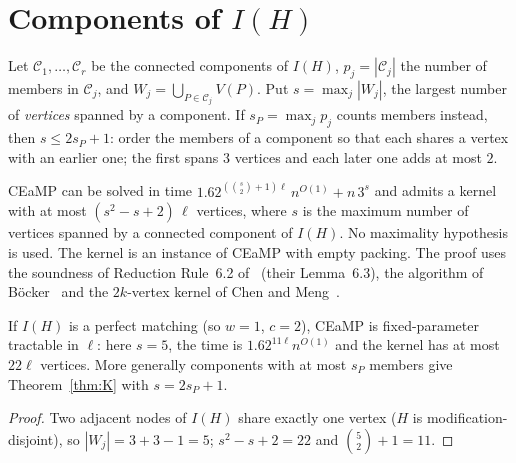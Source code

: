 \section{Components of \texorpdfstring{$I(H)$}{I(H)}}\label{sec:K}
Let $\mathcal C_1,\dots,\mathcal C_r$ be the connected components of $I(H)$, $p_j=|\mathcal C_j|$ the number of members in $\mathcal C_j$, and $W_j=\bigcup_{P\in\mathcal C_j}V(P)$. Put $s=\max_j|W_j|$, the largest number of \emph{vertices} spanned by a component. If $s_P=\max_jp_j$ counts members instead, then $s\le2s_P+1$: order the members of a component so that each shares a vertex with an earlier one; the first spans $3$ vertices and each later one adds at most $2$.

\begin{theorem}\label{thm:K}
CEaMP can be solved in time $1.62^{(\binom s2+1)\ell}\,n^{O(1)}+n\,3^{s}$ and admits a kernel with at most $(s^2-s+2)\,\ell$ vertices, where $s$ is the maximum number of vertices spanned by a connected component of $I(H)$. No maximality hypothesis is used. The kernel is an instance of CEaMP with empty packing. The proof uses the soundness of Reduction Rule~6.2 of~\cite{BFK18} (their Lemma~6.3), the algorithm of B\"ocker~\cite{Boe12} and the $2k$-vertex kernel of Chen and Meng~\cite{CM12}.
\end{theorem}

\begin{corollary}\label{cor:pm}
If $I(H)$ is a perfect matching (so $w=1$, $c=2$), CEaMP is fixed-parameter tractable in $\ell$: here $s=5$, the time is $1.62^{11\ell}n^{O(1)}$ and the kernel has at most $22\ell$ vertices. More generally components with at most $s_P$ members give Theorem~\ref{thm:K} with $s=2s_P+1$.
\end{corollary}
\begin{proof}
Two adjacent nodes of $I(H)$ share exactly one vertex ($H$ is modification-disjoint), so $|W_j|=3+3-1=5$; $s^2-s+2=22$ and $\binom52+1=11$.
\end{proof}

